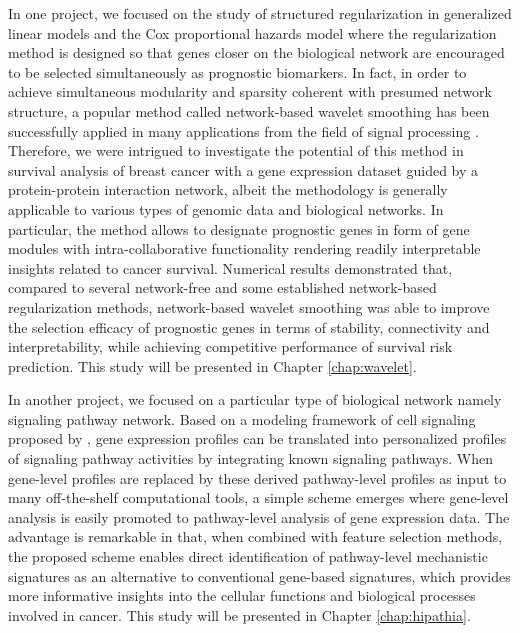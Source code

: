 In one project, we focused on the study of structured regularization in generalized linear models \cite{McCullagh1989Generalized} and the Cox proportional hazards model \cite{Cox1972Regression} where the regularization method is designed so that genes closer on the biological network are encouraged to be selected simultaneously as prognostic biomarkers. In fact, in order to achieve simultaneous modularity and sparsity coherent with presumed network structure, a popular method called network-based wavelet smoothing has been successfully applied in many applications from the field of signal processing \cite{Shuman2013emerging}. Therefore, we were intrigued to investigate the potential of this method in survival analysis of breast cancer with a gene expression dataset guided by a protein-protein interaction network, albeit the methodology is generally applicable to various types of genomic data and biological networks. In particular, the method allows to designate prognostic genes in form of gene modules with intra-collaborative functionality rendering readily interpretable insights related to cancer survival. Numerical results demonstrated that, compared to several network-free and some established network-based regularization methods, network-based wavelet smoothing was able to improve the selection efficacy of prognostic genes in terms of stability, connectivity and interpretability, while achieving competitive performance of survival risk prediction. This study will be presented in Chapter \ref{chap:wavelet}.


In another project, we focused on a particular type of biological network namely signaling pathway network. Based on a modeling framework of cell signaling proposed by \cite{Hidalgo2017High}, gene expression profiles can be translated into personalized profiles of signaling pathway activities by integrating known signaling pathways. When gene-level profiles are replaced by these derived pathway-level profiles as input to many off-the-shelf computational tools, a simple scheme emerges where gene-level analysis is easily promoted to pathway-level analysis of gene expression data. The advantage is remarkable in that, when combined with feature selection methods, the proposed scheme enables direct identification of pathway-level mechanistic signatures as an alternative to conventional gene-based signatures, which provides more informative insights into the cellular functions and biological processes involved in cancer. This study will be presented in Chapter \ref{chap:hipathia}.


